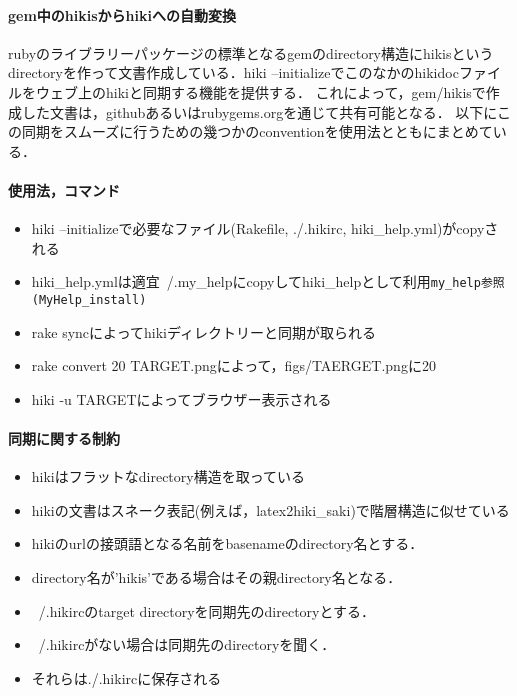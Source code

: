 \paragraph{gem中のhikisからhikiへの自動変換}
rubyのライブラリーパッケージの標準となるgemのdirectory構造にhikisというdirectoryを作って文書作成している．hiki --initializeでこのなかのhikidocファイルをウェブ上のhikiと同期する機能を提供する．
これによって，gem/hikisで作成した文書は，githubあるいはrubygems.orgを通じて共有可能となる．
以下にこの同期をスムーズに行うための幾つかのconventionを使用法とともにまとめている．

\paragraph{使用法，コマンド}
\begin{itemize}
\item hiki --initializeで必要なファイル(Rakefile, ./.hikirc, hiki\_help.yml)がcopyされる
\item hiki\_help.ymlは適宜~/.my\_helpにcopyしてhiki\_helpとして利用\verb|my_help参照(MyHelp_install)|
\item rake syncによってhikiディレクトリーと同期が取られる
\item rake convert 20 TARGET.pngによって，figs/TAERGET.pngに20%
\item hiki -u TARGETによってブラウザー表示される
\end{itemize}
\paragraph{同期に関する制約}
\begin{itemize}
\item hikiはフラットなdirectory構造を取っている
\item hikiの文書はスネーク表記(例えば，latex2hiki\_saki)で階層構造に似せている
\item hikiのurlの接頭語となる名前をbasenameのdirectory名とする．
\item directory名が'hikis'である場合はその親directory名となる．
\item ~/.hikircのtarget directoryを同期先のdirectoryとする．
\item ~/.hikircがない場合は同期先のdirectoryを聞く．
\item それらは./.hikircに保存される
\end{itemize}
